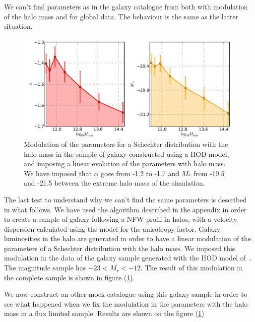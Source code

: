 We can't find parameters as in the galaxy catalogue from \citet{Guo+11} both
with modulation of the halo mass and for global data. The behaviour is the same
as the latter situation.
%
\begin{figure}[htb]
    \centering
    \includegraphics[width=0.8\linewidth]{figures/lf/evolSchechterLinGalPop}
    \caption{Modulation of the parameters for a Schechter distribution with the
        halo mass in the sample of galaxy constructed using a HOD model, and
        imposing a linear evolution of the parameters with halo mass. We have
        imposed that $\alpha$ goes from -1.2 to -1.7 and $M_*$ from -19.5 and
        -21.5 between the extreme halo mass of the
    simulation.}
\label{fig:paramschlin}
\end{figure}

The last test to understand why we can't find the same parameters is described
in what follows. We have used the algorithm described in the appendix  in order to create a sample of galaxy following a NFW profil in
halos, with a velocity dispersion calculated using the \citet{ML05} model for
the anisotropy factor. Galaxy luminosities in the halo are generated in order
to have a linear modulation of the parameters of a Schechter distribution with
the halo mass. We imposed this modulation in the data of the galaxy sample
generated with the HOD model of~\cite{Zehavi+11}. The magnitude sample has
$-23<M_r<-12$. The result of this modulation in the complete sample
is shown in figure (\ref{fig:paramschlin}).

We now construct an other mock catalogue using this galaxy sample in order to
see what happened when we fix the modulation in the parameters with the halo
mass in a flux limited sample. Results are shown on the figure
(\ref{fig:paramschlin})

